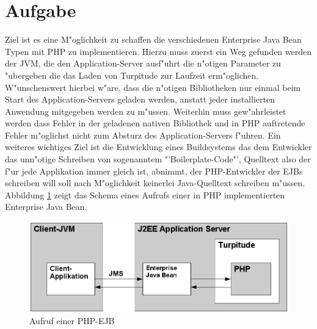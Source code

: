 \section{Aufgabe}
\label{sec:chap2:task}

Ziel ist es eine M"oglichkeit zu schaffen die verschiedenen Enterprise Java Bean Typen mit 
PHP zu implementieren. Hierzu muss zuerst ein Weg gefunden werden der JVM, die den Application-Server 
ausf"uhrt die n"otigen Parameter zu "ubergeben die das Laden von Turpitude zur Laufzeit erm"oglichen.
W"unschenswert hierbei w"are, dass die n"otigen Bibliotheken nur einmal beim Start des Application-Servers
geladen werden, anstatt jeder installierten Anwendung mitgegeben werden zu m"ussen. Weiterhin muss gew"ahrleistet
werden dass Fehler in der geladenen nativen Bibliothek und in PHP auftretende Fehler m"oglichst nicht zum Absturz des
Application-Servers f"uhren. Ein weiteres wichtiges Ziel ist die Entwicklung eines Buildsystems das dem
Entwickler das unn"otige Schreiben von sogenanntem "'Boilerplate-Code"', Quelltext also der f"ur jede
Applikation immer gleich ist, abnimmt, der PHP-Entwickler der EJBs schreiben will soll nach M"oglichkeit
keinerlei Java-Quelltext schreiben m"ussen. Abbildung \ref{fig:phpejb} zeigt das Schema eines Aufrufs einer
in PHP implementierten Enterprise Java Bean.

\begin{figure}[h]
\includegraphics[width=\textwidth]{chap2/img/phpejb.png}
\caption{Aufruf einer PHP-EJB}
\label{fig:phpejb}
\end{figure}

